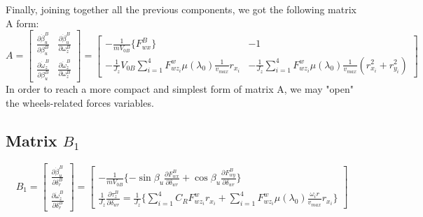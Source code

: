 \documentclass[a4paper,12pt,titlepage]{report}
\begin{document}
	Finally, joining together all the previous components, we got the following matrix A form:
		\begin{equation}
			A=
			\begin{bmatrix}
				\frac{\partial\dot{\beta}_{u}^{B}}{\partial\beta_{u}^{B}} & \frac{\partial\dot{\beta}_{u}^{B}}{\partial\omega_{z}^{B}} \\
				\frac{\partial\dot{\omega}_{z}^{B}}{\partial\beta_{u}^{B}} & \frac{\partial\dot{\omega}_{z}^{B}}{\partial\omega_{z}^{B}}
			\end{bmatrix} = 
			\begin{bmatrix}
				 -\frac{1}{mV_{0B}}\{F_{wx}^{B}\}  & -1  \\
				  -\frac{1}{J_{z}} V_{0B} \sum\limits_{i=1}^4 F_{wz_{i}}^{w} \mu(\lambda_{0}) \frac{1}{v_{max}}r_{x_{i}} &  -\frac{1}{J_{z}}\sum\limits_{i=1}^4 F_{wz_{i}}^{w} \mu(\lambda_{0}) \frac{1}{v_{max}} (r_{x_{i}}^{2} + r_{y_{i}}^{2}) 
			\end{bmatrix}
		\end{equation}
	In order to reach a more compact and simplest form of matrix A, we may "open" the  wheels-related forces variables.
	\subsection{Matrix $B_{1}$} \label{B1}
		\begin{equation}
			B_{1}=
			\begin{bmatrix} 
				\frac{\partial\dot{\beta}_{u}^{B}}{\partial\delta_{r}^{B}} \\
				\frac{\partial\dot{\omega}_{z}^{B}}{\partial\delta_{r}^{B}}
			\end{bmatrix} = 
			\begin{bmatrix}
				-\frac{1}{mV_{0B}}\{-\sin\beta_{u}\frac{\partial F_{wx}^{B}}{\partial \delta_{wr}} + \cos\beta_{u}\frac{\partial F_{wy}^{B}}{\partial \delta_{wr}}\}  \\
				\frac{1}{J_{z}} \frac{\partial \tau_{z}^{B}}{\partial\delta_{wr}} = \frac{1}{J_{z}} \{ \sum\limits_{i=1}^4 C_{R}F_{wz_{i}}^{w} r_{x_{i}} + \sum\limits_{i=1}^4 F_{wz_{i}}^{w} \mu(\lambda_{0}) \frac{\omega_{i} r}{v_{max}}r_{x_{i}} \}
			\end{bmatrix}
		\end{equation} 
\end{document}
